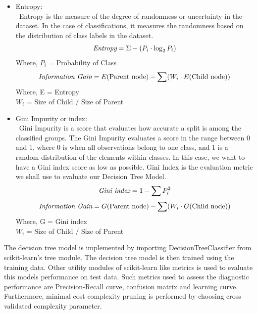 \begin{itemize}
\item Entropy:\\
        \textopenbullet\ Entropy is the measure of the degree of randomness or uncertainty in the dataset. In the case of classifications, it measures the randomness based on the distribution of class labels in the dataset.
        \begin{equation}
\textit{\text{Entropy}} = \Sigma - \left( P_i \cdot \log_2{P_i} \right)
\end{equation}
Where, \(P_i\) = Probability of Class\\
\begin{equation}
\textit{\text{Information Gain}} = E(\text{Parent node}) - \sum (W_i \cdot E(\text{Child node}))
\end{equation}
Where, E = Entropy\\
\(W_i\) = Size of Child / Size of Parent 
\item Gini Impurity or index:\\
        \textopenbullet\ Gini Impurity is a score that evaluates how accurate a split is among the classified groups. The Gini Impurity evaluates a score in the range between 0 and 1, where 0 is when all observations belong to one class, and 1 is a random distribution of the elements within classes. In this case, we want to have a Gini index score as low as possible. Gini Index is the evaluation metric we shall use to evaluate our Decision Tree Model.\\ 
\begin{equation}
\textit{\text{Gini index}} = 1 - \sum P_i^2
\end{equation}
\begin{equation}
\textit{\text{Information Gain}} = G(\text{Parent node}) - \sum (W_i \cdot G(\text{Child node}))
\end{equation}
Where, G = Gini index\\
\(W_i\) = Size of Child / Size of Parent  
\end{itemize}
The decision tree model is implemented by importing DecisionTreeClassifier from scikit-learn's tree module. The decision tree model is then trained using the training data. Other utility modules of scikit-learn like metrics is used to evaluate this models performance on test data. Such metrics used to assess the diagnostic performance are Precision-Recall curve, confusion matrix and learning curve. Furthermore, minimal cost complexity pruning is performed by choosing cross validated complexity parameter. 
